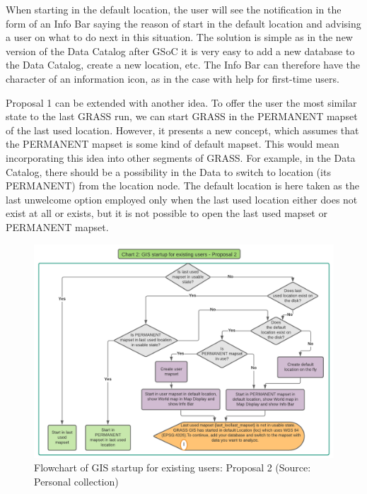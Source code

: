 \documentclass[a4paper,10pt,twoside]{article}
\begin{document}
When starting in the default location, the user will see the notification in the form of an Info Bar saying the reason of start in the default location and advising a user on what to do next in this situation. The solution is simple as in the new version of the Data Catalog after GSoC it is very easy to add a new database to the Data Catalog, create a new location, etc. The Info Bar can therefore have the character of an information icon, as in the case with help for first-time users.

Proposal 1 can be extended with another idea. To offer the user the most similar state to the last GRASS run, we can start GRASS in the PERMANENT mapset of the last used location. However, it presents a new concept, which assumes that the PERMANENT mapset is some kind of default mapset. This would mean incorporating this idea into other segments of GRASS. For example, in the Data Catalog, there should be a possibility in the Data to switch to location (its PERMANENT) from the location node. The default location is here taken as the last unwelcome option employed only when the last used location either does not exist at all or exists, but it is not possible to open the last used mapset or PERMANENT mapset.
 

\vspace{0.3cm}
\begin{figure}[hbt!] 
\begin{center}
\includegraphics[width=17cm]{../pictures/normal_user_diagram2.png} 
\caption[Flowchart of GIS startup for existing users: Proposal 2]{Flowchart of GIS startup for existing users: Proposal 2 (Source: Personal collection)}
\label{fig:normal_user_diagram2}
\end{center}
\end{figure}
\end{document}
